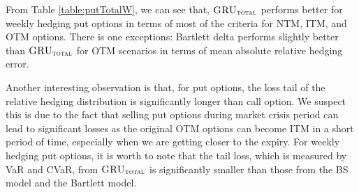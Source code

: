 \documentclass[letterpaper,12pt,titlepage,oneside,final]{book}
\numberwithin{equation}{section}
\theoremstyle{definition}
\newcommand{\modelT}{\textsc{GRU}_{\textsc{total}}}
\begin{document}
From Table \ref{table:putTotalW}, we can see that, $\modelT$  performs better for weekly hedging put options in terms of most of the criteria for NTM, ITM, and OTM options.  There  is one  exceptions: Bartlett delta performs  slightly better than $\modelT$ for OTM scenarios in terms of mean absolute relative hedging error. 

Another interesting observation is that, for put options, the loss tail of the relative hedging distribution is significantly longer than call option. We suspect this is due to the fact that selling put options during market crisis period can lead to significant losses as the original OTM options can become ITM in a short period of time, especially when we are getting closer to the expiry. For weekly hedging put options,  it is worth to note that  the tail loss, which is measured by VaR and CVaR, from  $\modelT$ is significantly  smaller than those from the BS model and the Bartlett model. 
\end{document}
